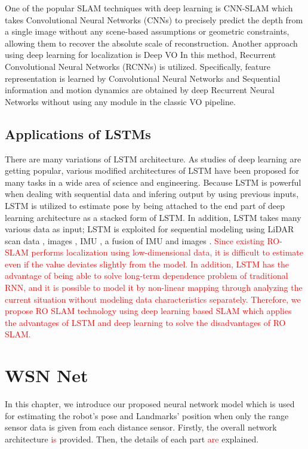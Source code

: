 \documentclass{ieeeaccess}
\begin{document}
One of the popular SLAM techniques with deep learning is CNN-SLAM \cite{tateno2017cnn} which takes Convolutional Neural Networks (CNNs) to precisely predict the depth from a single image without any scene-based assumptions or geometric constraints, allowing them to recover the absolute scale of reconstruction. Another approach using deep learning for localization is Deep VO \cite{clark2017vinet} In this method, Recurrent Convolutional Neural Networks (RCNNs) is utilized. Specifically, feature representation is learned by Convolutional Neural Networks and Sequential information and motion dynamics are obtained by deep Recurrent Neural Networks without using any module in the classic VO pipeline.

\subsection{Applications of LSTMs}

There are many variations of LSTM architecture. As studies of deep learning are getting popular, various modified architectures of LSTM have been proposed for many tasks in a wide area of science and engineering. Because LSTM is powerful when dealing with sequential data and infering output by using previous inputs, LSTM is utilized to estimate pose by being attached to the end part of deep learning architecture \cite{wang2017deepvo, kendall2015posenet, turan2018deep}  as a stacked form of LSTM. In addition, LSTM takes many various data as input; LSTM is exploited for sequential modeling using LiDAR scan data \cite{gladh2016deep}, images \cite{walch2017image, wang2017deepvo}, IMU \cite{ordonez2016deep}, a fusion of IMU and images \cite{clark2017vinet}. \textcolor{red}{Since existing RO-SLAM performs localization using low-dimensional data, it is difficult to estimate even if the value deviates slightly from the model. In addition, LSTM has the advantage of being able to solve long-term dependence problem of traditional RNN, and it is possible to model it by non-linear mapping through analyzing the current situation without modeling data characteristics separately. Therefore, we propose RO SLAM technology using deep learning based SLAM which applies the advantages of LSTM and deep learning to solve the disadvantages of RO SLAM.}


\section{WSN Net}


In this chapter, we introduce our proposed neural network model which is used for estimating the robot’s pose and Landmarks’ position when only the range sensor data is given from each distance sensor. Firstly, the overall network architecture \textcolor{red}{is} provided. Then, the details of each part \textcolor{red}{are} explained.  
\end{document}
